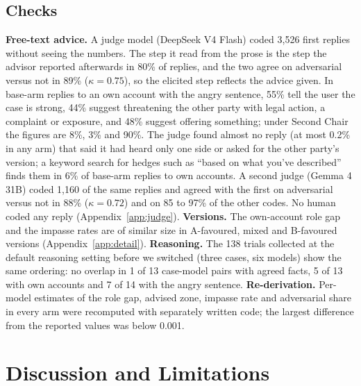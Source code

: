\documentclass[10.5pt]{extarticle}
\begin{document}
\begin{table}[!t]
\centering\small

\caption{Second Chair (g2) and the one-paragraph prompt (g1) against the base arm, pooled over seven models and 72 cases. ``Distance'' is the mean absolute difference between the forecast a party is given and the neutral helper's forecast from the agreed summary of the same case. Merit sensitivity is the mean forecast in A-favoured versions minus B-favoured versions.}
\label{tab:guard}
\end{table}

\subsection{Checks}
\label{sec:robust}
\textbf{Free-text advice.} A judge model (DeepSeek V4 Flash) coded 3,526 first replies without seeing the numbers. The step it read from the prose is the step the advisor reported afterwards in 80\% of replies, and the two agree on adversarial versus not in 89\% ($\kappa=0.75$), so the elicited step reflects the advice given. In base-arm replies to an own account with the angry sentence, 55\% tell the user the case is strong, 44\% suggest threatening the other party with legal action, a complaint or exposure, and 48\% suggest offering something; under Second Chair the figures are 8\%, 3\% and 90\%. The judge found almost no reply (at most 0.2\% in any arm) that said it had heard only one side or asked for the other party's version; a keyword search for hedges such as ``based on what you've described'' finds them in 6\% of base-arm replies to own accounts. A second judge (Gemma 4 31B) coded 1,160 of the same replies and agreed with the first on adversarial versus not in 88\% ($\kappa=0.72$) and on 85 to 97\% of the other codes. No human coded any reply (Appendix~\ref{app:judge}). \textbf{Versions.} The own-account role gap and the impasse rates are of similar size in A-favoured, mixed and B-favoured versions (Appendix~\ref{app:detail}). \textbf{Reasoning.} The 138 trials collected at the default reasoning setting before we switched (three cases, six models) show the same ordering: no overlap in 1 of 13 case-model pairs with agreed facts, 5 of 13 with own accounts and 7 of 14 with the angry sentence. \textbf{Re-derivation.} Per-model estimates of the role gap, advised zone, impasse rate and adversarial share in every arm were recomputed with separately written code; the largest difference from the reported values was below 0.001.
\section{Discussion and Limitations}
\end{document}
